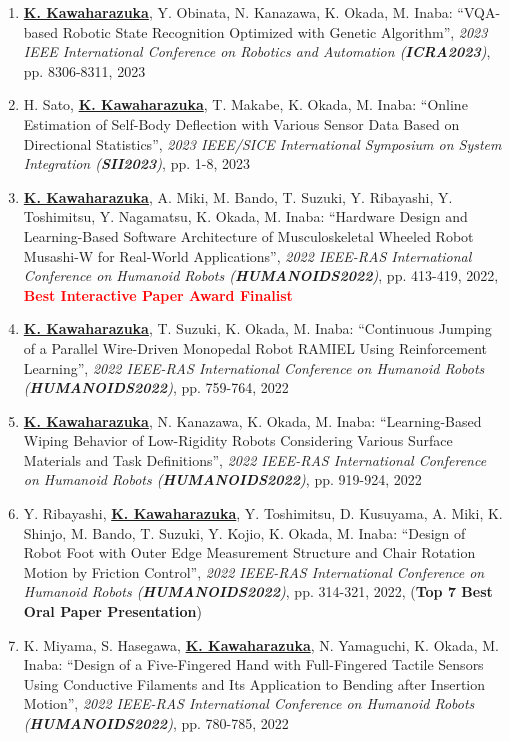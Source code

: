 \documentclass[letterpaper,11pt]{article}
\begin{document}
\begin{enumerate}
\item \underline{\textbf{K. Kawaharazuka}}, Y. Obinata, N. Kanazawa, K. Okada, M. Inaba: ``VQA-based Robotic State Recognition Optimized with Genetic Algorithm'', \textit{2023 IEEE International Conference on Robotics and Automation (\textit{\textbf{ICRA2023}})}, pp. 8306-8311, 2023
\item H. Sato, \underline{\textbf{K. Kawaharazuka}}, T. Makabe, K. Okada, M. Inaba: ``Online Estimation of Self-Body Deflection with Various Sensor Data Based on Directional Statistics'', \textit{2023 IEEE/SICE International Symposium on System Integration (\textit{\textbf{SII2023}})}, pp. 1-8, 2023
\item \underline{\textbf{K. Kawaharazuka}}, A. Miki, M. Bando, T. Suzuki, Y. Ribayashi, Y. Toshimitsu, Y. Nagamatsu, K. Okada, M. Inaba: ``Hardware Design and Learning-Based Software Architecture of Musculoskeletal Wheeled Robot Musashi-W for Real-World Applications'', \textit{2022 IEEE-RAS International Conference on Humanoid Robots (\textit{\textbf{HUMANOIDS2022}})}, pp. 413-419, 2022, \textbf{\textcolor{red}{Best Interactive Paper Award Finalist}}
\item \underline{\textbf{K. Kawaharazuka}}, T. Suzuki, K. Okada, M. Inaba: ``Continuous Jumping of a Parallel Wire-Driven Monopedal Robot RAMIEL Using Reinforcement Learning'', \textit{2022 IEEE-RAS International Conference on Humanoid Robots (\textit{\textbf{HUMANOIDS2022}})}, pp. 759-764, 2022
\item \underline{\textbf{K. Kawaharazuka}}, N. Kanazawa, K. Okada, M. Inaba: ``Learning-Based Wiping Behavior of Low-Rigidity Robots Considering Various Surface Materials and Task Definitions'', \textit{2022 IEEE-RAS International Conference on Humanoid Robots (\textit{\textbf{HUMANOIDS2022}})}, pp. 919-924, 2022
\item Y. Ribayashi, \underline{\textbf{K. Kawaharazuka}}, Y. Toshimitsu, D. Kusuyama, A. Miki, K. Shinjo, M. Bando, T. Suzuki, Y. Kojio, K. Okada, M. Inaba: ``Design of Robot Foot with Outer Edge Measurement Structure and Chair Rotation Motion by Friction Control'', \textit{2022 IEEE-RAS International Conference on Humanoid Robots (\textit{\textbf{HUMANOIDS2022}})}, pp. 314-321, 2022, (\textbf{Top 7 Best Oral Paper Presentation})
\item K. Miyama, S. Hasegawa, \underline{\textbf{K. Kawaharazuka}}, N. Yamaguchi, K. Okada, M. Inaba: ``Design of a Five-Fingered Hand with Full-Fingered Tactile Sensors Using Conductive Filaments and Its Application to Bending after Insertion Motion'', \textit{2022 IEEE-RAS International Conference on Humanoid Robots (\textit{\textbf{HUMANOIDS2022}})}, pp. 780-785, 2022

\end{enumerate}
\end{document}
